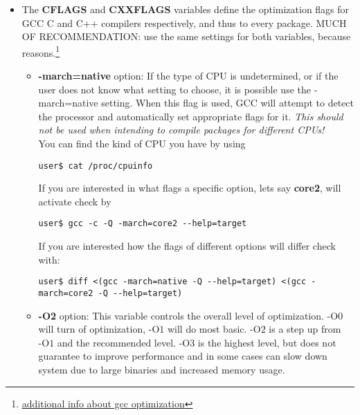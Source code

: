 \documentclass[10pt,a4paper]{article}
\begin{document}
\begin{enumerate}
\begin{enumerate}[label*=\arabic*.]
			\begin{itemize}
				\item The \textbf{CFLAGS} and \textbf{CXXFLAGS} variables define the optimization flags for GCC C and C++ compilers respectively, and thus to every package. MUCH OF RECOMMENDATION: use the same settings for both variables, because reasons.\footnote{ \href{https://wiki.gentoo.org/wiki/GCC_optimization}{additional info about gcc optimization}}
				


				\begin{itemize}[label={o}]
					\item \textbf{-march=native} option: If the type of CPU is undetermined, or if the user does not know what setting to choose, it is possible use the -march=native setting. When this flag is used, GCC will attempt to detect the processor and automatically set appropriate flags for it. \textit{This should not be used when intending to compile packages for different CPUs!}\\
					You can find the kind of CPU you have by using
					\begin{lstlisting}[style=BashInputUser]					
user$ cat /proc/cpuinfo					
					\end{lstlisting}

					If you are interested in what flags a specific option, lets say \textbf{core2}, will activate check by
					\begin{lstlisting}[style=BashInputUser]
user$ gcc -c -Q -march=core2 --help=target
					\end{lstlisting}

					If you are interested how the flags of different options will differ check with:
					\begin{lstlisting}[style=BashInputUser]
user$ diff <(gcc -march=native -Q --help=target) <(gcc -march=core2 -Q --help=target)
					\end{lstlisting}
					
					\item \textbf{-O2} option: This variable controls the overall level of optimization. $ \mbox{-O}0 $ will turn of optimization, $ \mbox{-O}1 $ will do most basic. $ \mbox{-O}2 $ is a step up from $ \mbox{-O}1 $ and the recommended level. $ \mbox{-O}3 $ is the highest level, but does not guarantee to improve performance and in some cases can slow down system due to large binaries and increased memory usage.
					

\end{itemize}
\end{itemize}
\end{enumerate}
\end{enumerate}
\end{document}
